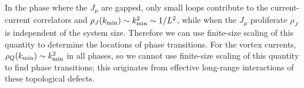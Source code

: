 In the phase where the $J_\mu$ are gapped, only small loops contribute to the current-current correlators and $\rho_J(k_{\rm min})\sim {k}_{\rm min}^2 \sim 1/L^2$, while when the $J_\mu$ proliferate $\rho_J$ is independent of the system size. Therefore we can use finite-size scaling of this quantity to determine the locations of phase transitions. For the vortex currents, $\rho_Q(k_{\rm min})\sim {k}_{\rm min}^2$ in all phases, so we cannot use finite-size scaling of this quantity to find phase transitions; this originates from effective long-range interactions of these topological defects.




